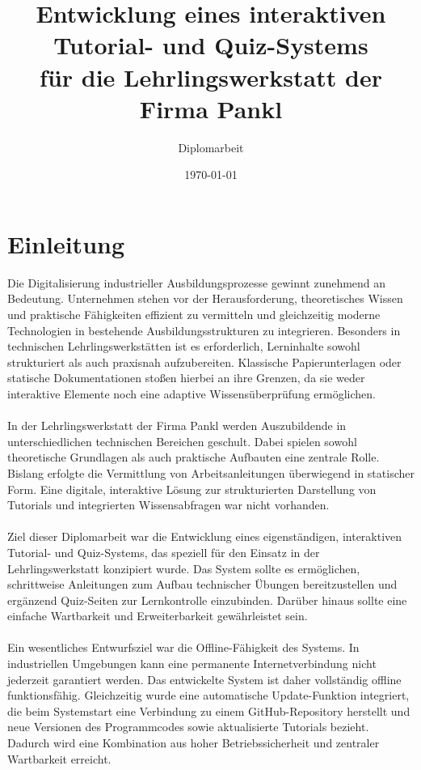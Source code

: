 \documentclass[12pt,a4paper]{report}
\begin{document}
\title{Entwicklung eines interaktiven Tutorial- und Quiz-Systems \\ 
für die Lehrlingswerkstatt der Firma Pankl}
\author{Diplomarbeit}
\date{\today}

\maketitle
\tableofcontents
\newpage

\chapter{Einleitung}

Die Digitalisierung industrieller Ausbildungsprozesse gewinnt zunehmend an Bedeutung. Unternehmen stehen vor der Herausforderung, theoretisches Wissen und praktische Fähigkeiten effizient zu vermitteln und gleichzeitig moderne Technologien in bestehende Ausbildungsstrukturen zu integrieren. Besonders in technischen Lehrlingswerkstätten ist es erforderlich, Lerninhalte sowohl strukturiert als auch praxisnah aufzubereiten. Klassische Papierunterlagen oder statische Dokumentationen stoßen hierbei an ihre Grenzen, da sie weder interaktive Elemente noch eine adaptive Wissensüberprüfung ermöglichen.
\\\\
In der Lehrlingswerkstatt der Firma Pankl werden Auszubildende in unterschiedlichen technischen Bereichen geschult. Dabei spielen sowohl theoretische Grundlagen als auch praktische Aufbauten eine zentrale Rolle. Bislang erfolgte die Vermittlung von Arbeitsanleitungen überwiegend in statischer Form. Eine digitale, interaktive Lösung zur strukturierten Darstellung von Tutorials und integrierten Wissensabfragen war nicht vorhanden.
\\\\
Ziel dieser Diplomarbeit war die Entwicklung eines eigenständigen, interaktiven Tutorial- und Quiz-Systems, das speziell für den Einsatz in der Lehrlingswerkstatt konzipiert wurde. Das System sollte es ermöglichen, schrittweise Anleitungen zum Aufbau technischer Übungen bereitzustellen und ergänzend Quiz-Seiten zur Lernkontrolle einzubinden. Darüber hinaus sollte eine einfache Wartbarkeit und Erweiterbarkeit gewährleistet sein.
\\\\
Ein wesentliches Entwurfsziel war die Offline-Fähigkeit des Systems. In industriellen Umgebungen kann eine permanente Internetverbindung nicht jederzeit garantiert werden. Das entwickelte System ist daher vollständig offline funktionsfähig. Gleichzeitig wurde eine automatische Update-Funktion integriert, die beim Systemstart eine Verbindung zu einem GitHub-Repository herstellt und neue Versionen des Programmcodes sowie aktualisierte Tutorials bezieht. Dadurch wird eine Kombination aus hoher Betriebssicherheit und zentraler Wartbarkeit erreicht.
\end{document}
